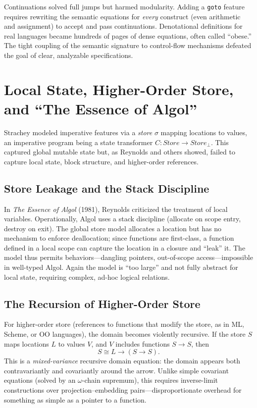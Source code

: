 \documentclass[11pt]{article}
\begin{document}
Continuations solved full jumps but harmed modularity. Adding a \texttt{goto} feature
requires rewriting the semantic equations for \emph{every} construct (even arithmetic and
assignment) to accept and pass continuations. Denotational definitions for real languages
became hundreds of pages of dense equations, often called ``obese.'' The tight coupling of
the semantic signature to control-flow mechanisms defeated the goal of clear, analyzable
specifications.

\section{Local State, Higher-Order Store, and ``The Essence of Algol''}

Strachey modeled imperative features via a \emph{store} $\sigma$ mapping locations to
values, an imperative program being a state transformer
$C : \mathit{Store} \to \mathit{Store}_\bot$. This captured global mutable state but,
as Reynolds and others showed, failed to capture local state, block structure, and
higher-order references.

\subsection{Store Leakage and the Stack Discipline}

In \emph{The Essence of Algol} (1981), Reynolds criticized the treatment of local
variables. Operationally, Algol uses a stack discipline (allocate on scope entry, destroy
on exit). The global store model allocates a location but has no mechanism to enforce
deallocation; since functions are first-class, a function defined in a local scope can
capture the location in a closure and ``leak'' it. The model thus permits
behaviors---dangling pointers, out-of-scope access---impossible in well-typed Algol. Again
the model is ``too large'' and not fully abstract for local state, requiring complex,
ad-hoc logical relations.

\subsection{The Recursion of Higher-Order Store}

For higher-order store (references to functions that modify the store, as in ML, Scheme,
or OO languages), the domain becomes violently recursive. If the store $S$ maps locations
$L$ to values $V$, and $V$ includes functions $S \to S$, then
\[
  S \cong L \to (S \to S).
\]
This is a \emph{mixed-variance} recursive domain equation: the domain appears both
contravariantly and covariantly around the arrow. Unlike simple covariant equations
(solved by an $\omega$-chain supremum), this requires inverse-limit constructions over
projection--embedding pairs---disproportionate overhead for something as simple as a
pointer to a function.
\end{document}
